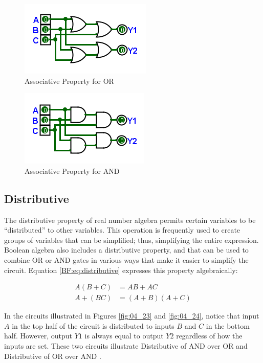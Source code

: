 \begin{figure}[H]
	\centering
	\includegraphics[width=\maxwidth{.95\linewidth}]{gfx/04_21}
	\caption{Associative Property for OR}
	\label{fig:04_21}
\end{figure}

\begin{figure}[H]
	\centering
	\includegraphics[width=\maxwidth{.95\linewidth}]{gfx/04_22}
	\caption{Associative Property for AND}
	\label{fig:04_22}
\end{figure}

\subsection{Distributive}
\label{BF:subsec:distributive_property}

The distributive property of real number algebra permits certain variables to be ``distributed'' to other variables. This operation is frequently used to create groups of variables that can be simplified; thus, simplifying the entire expression. Boolean algebra also includes a distributive property, and that can be used to combine \textsf{OR}  or \textsf{AND}  gates in various ways that make it easier to simplify the circuit. Equation \ref{BF:eq:distributive} expresses this property algebraically:

\begin{align}
  \label{BF:eq:distributive}
  A( B + C ) &= AB + AC \\
  \nonumber
  A + (BC) &= (A + B) (A + C)
\end{align}

In the circuits illustrated in Figures \ref{fig:04_23} and \ref{fig:04_24}, notice that input $ A $ in the top half of the circuit is distributed to inputs $ B $ and $ C $ in the bottom half. However, output $ Y1 $ is always equal to output $ Y2 $ regardless of how the inputs are set. These two circuits illustrate Distributive of \textsf{AND} over \textsf{OR}  and Distributive of \textsf{OR} over \textsf{AND} .
 
